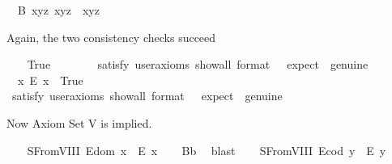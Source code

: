 \begin{isabellebody}
\ \ B{}{\isacharcolon}\ {\isachardoublequoteopen}\isactrlbold {\isasymforall}x{\isachardot}\isactrlbold {\isasymforall}y{\isachardot}\isactrlbold {\isasymforall}z{\isachardot}\ x{\isasymcdot}{\isacharparenleft}y{\isasymcdot}z{\isacharparenright}\ {\isasymcong}\ {\isacharparenleft}x{\isasymcdot}y{\isacharparenright}{\isasymcdot}z{\isachardoublequoteclose}%
\begin{isamarkuptext}%
Again, the two consistency checks succeed%
\end{isamarkuptext}\isamarkuptrue%
\ \ \isamarkupfalse%
\ True\ \ %
\isanewline
\ \ \ \ \isamarkupfalse%
\ {\isacharbrackleft}satisfy{\isacharcomma}\ user{\isacharunderscore}axioms{\isacharcomma}\ show{\isacharunderscore}all{\isacharcomma}\ format\ {\isacharequal}\ {}{\isacharcomma}\ expect\ {\isacharequal}\ genuine{\isacharbrackright}%
\isadelimproof
\ %
\endisadelimproof
%
\isatagproof
{}\isamarkupfalse%
%
\endisatagproof
{\isafoldproof}%
%
\isadelimproof
%
\endisadelimproof
\isanewline
\ \ \isamarkupfalse%
\ \ {\isachardoublequoteopen}{\isasymexists}x{\isachardot}\ \isactrlbold {\isasymnot}{\isacharparenleft}E\ x{\isacharparenright}{\isachardoublequoteclose}\ \ True\ \ \ %
\ \ \isanewline
\ \ \ \ \isamarkupfalse%
\ {\isacharbrackleft}satisfy{\isacharcomma}\ user{\isacharunderscore}axioms{\isacharcomma}\ show{\isacharunderscore}all{\isacharcomma}\ format\ {\isacharequal}\ {}{\isacharcomma}\ expect\ {\isacharequal}\ genuine{\isacharbrackright}%
\isadelimproof
\ %
\endisadelimproof
%
\isatagproof
{}\isamarkupfalse%
%
\endisatagproof
{\isafoldproof}%
%
\isadelimproof
%
\endisadelimproof
%
\begin{isamarkuptext}%
Now Axiom Set V is implied.%
\end{isamarkuptext}\isamarkuptrue%
\ \ \isamarkupfalse%
\ S{}FromVIII{\isacharcolon}\ {\isachardoublequoteopen}E{\isacharparenleft}dom\ x{\isacharparenright}\ \isactrlbold {\isasymrightarrow}\ E\ x{\isachardoublequoteclose}%
\isadelimproof
\ \ %
\endisadelimproof
%
\isatagproof
{}\isamarkupfalse%
\ B{}b\ \isamarkupfalse%
\ blast%
\endisatagproof
{\isafoldproof}%
%
\isadelimproof
%
\endisadelimproof
\isanewline
\ \ \isamarkupfalse%
\ S{}FromVIII{\isacharcolon}\ {\isachardoublequoteopen}E{\isacharparenleft}cod\ y{\isacharparenright}\ \isactrlbold {\isasymrightarrow}\ E\ y{\isachardoublequoteclose}%

\end{isabellebody}
